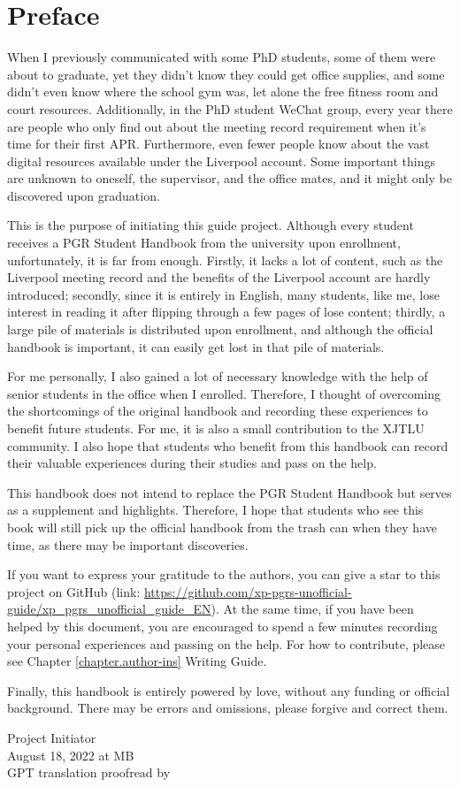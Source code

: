 \chapter{Preface}
\thispagestyle{empty}
When I previously communicated with some PhD students, some of them were about to graduate, yet they didn't know they could get office supplies, and some didn't even know where the school gym was, let alone the free fitness room and court resources. Additionally, in the PhD student WeChat group, every year there are people who only find out about the meeting record requirement when it's time for their first APR. Furthermore, even fewer people know about the vast digital resources available under the Liverpool account. Some important things are unknown to oneself, the supervisor, and the office mates, and it might only be discovered upon graduation.

This is the purpose of initiating this guide project. Although every student receives a PGR Student Handbook from the university upon enrollment, unfortunately, it is far from enough. Firstly, it lacks a lot of content, such as the Liverpool meeting record and the benefits of the Liverpool account are hardly introduced; secondly, since it is entirely in English, many students, like me, lose interest in reading it after flipping through a few pages of lose content; thirdly, a large pile of materials is distributed upon enrollment, and although the official handbook is important, it can easily get lost in that pile of materials.

For me personally, I also gained a lot of necessary knowledge with the help of senior students in the office when I enrolled. Therefore, I thought of overcoming the shortcomings of the original handbook and recording these experiences to benefit future students. For me, it is also a small contribution to the XJTLU community. I also hope that students who benefit from this handbook can record their valuable experiences during their studies and pass on the help.

This handbook does not intend to replace the PGR Student Handbook but serves as a supplement and highlights. Therefore, I hope that students who see this book will still pick up the official handbook from the trash can when they have time, as there may be important discoveries.

If you want to express your gratitude to the authors, you can give a star to this project on GitHub (link: \url{https://github.com/xp-pgrs-unofficial-guide/xp_pgrs_unofficial_guide_EN}). At the same time, if you have been helped by this document, you are encouraged to spend a few minutes recording your personal experiences and passing on the help. For how to contribute, please see Chapter \ref{chapter.author-ins} Writing Guide.

Finally, this handbook is entirely powered by love, without any funding or official background. There may be errors and omissions, please forgive and correct them.

\begin{flushright}
Project Initiator \KW \\
August 18, 2022 at MB \\
GPT translation proofread by \Shiyao
\end{flushright}


